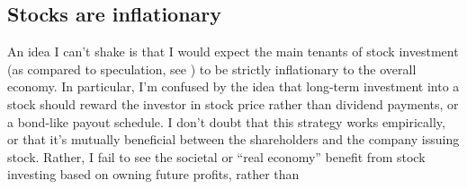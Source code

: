 \subsection{Stocks are inflationary}

An idea I can't shake is that I would expect the main tenants of stock investment (as compared to speculation, see ) to be strictly inflationary to the overall economy.  In particular, I'm confused by the idea that long-term investment into a stock should reward the investor in stock price rather than dividend payments, or a bond-like payout schedule.  I don't doubt that this strategy works empirically, or that it's mutually beneficial between the shareholders and the company issuing stock.  Rather, I fail to see the societal or ``real economy'' benefit from stock investing based on owning future profits, rather than 